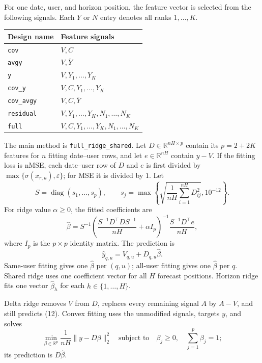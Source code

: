 \documentclass[11pt]{article}
\newcommand{\eps}{\varepsilon}
\begin{document}
For one date, user, and horizon position, the feature vector is selected from
the following signals. Each $Y$ or $N$ entry denotes all ranks $1,\ldots,K$.
\begin{center}
\small
\begin{tabular}{@{}ll@{}}
\toprule
Design name & Feature signals \\
\midrule
\texttt{cov} & $V,C$ \\
\texttt{avgy} & $V,\bar Y$ \\
\texttt{y} & $V,Y_1,\ldots,Y_K$ \\
\texttt{cov\_y} & $V,C,Y_1,\ldots,Y_K$ \\
\texttt{cov\_avgy} & $V,C,\bar Y$ \\
\texttt{residual} & $V,Y_1,\ldots,Y_K,N_1,\ldots,N_K$ \\
\texttt{full} & $V,C,Y_1,\ldots,Y_K,N_1,\ldots,N_K$ \\
\bottomrule
\end{tabular}
\end{center}

The main method is \texttt{full\_ridge\_shared}. Let $D\in\mathbb R^{nH\times p}$
contain its $p=2+2K$ features for $n$ fitting date--user rows, and let
$e\in\mathbb R^{nH}$ contain $y-V$. If the fitting loss is nMSE, each date--user
row of $D$ and $e$ is first divided by
$\max\{\sigma(x_{r,u}),\eps\}$; for MSE it is divided by $1$. Let
\[
 S=\operatorname{diag}(s_1,\ldots,s_p),\qquad
 s_j=\max\left\{\sqrt{\frac1{nH}\sum_{i=1}^{nH}D_{ij}^2},10^{-12}\right\}.
\]
For ridge value $\alpha\ge0$, the fitted coefficients are
\[
 \widehat\beta
 =S^{-1}\left(\frac{S^{-1}D^\top D S^{-1}}{nH}+\alpha I_p\right)^{-1}
 \frac{S^{-1}D^\top e}{nH},                                  \tag{11}
\]
where $I_p$ is the $p\times p$ identity matrix. The prediction is
\[
 \widehat y_{q,u}=V_{q,u}+D_{q,u}\widehat\beta.              \tag{12}
\]
Same-user fitting gives one $\widehat\beta$ per $(q,u)$; all-user fitting gives
one $\widehat\beta$ per $q$. Shared ridge uses one coefficient vector for all
$H$ forecast positions. Horizon ridge fits one vector $\widehat\beta_h$ for
each $h\in\{1,\ldots,H\}$.

Delta ridge removes $V$ from $D$, replaces every remaining signal $A$ by
$A-V$, and still predicts (12). Convex fitting uses the unmodified signals,
targets $y$, and solves
\[
 \min_{\beta\in\mathbb R^p}\frac1{nH}\|y-D\beta\|_2^2
 \quad\text{subject to}\quad \beta_j\ge0,
 \quad\sum_{j=1}^p\beta_j=1;                                \tag{13}
\]
its prediction is $D\widehat\beta$.
\end{document}
